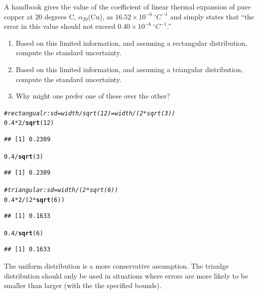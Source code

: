 \documentclass[twoside]{book}\usepackage[]{graphicx}\usepackage[]{xcolor}
\makeatletter
\newcommand{\hlnum}[1]{\textcolor[rgb]{0.686,0.059,0.569}{#1}}%
\newcommand{\hlcom}[1]{\textcolor[rgb]{0.678,0.584,0.686}{\textit{#1}}}%
\newcommand{\hlopt}[1]{\textcolor[rgb]{0,0,0}{#1}}%
\newcommand{\hlstd}[1]{\textcolor[rgb]{0.345,0.345,0.345}{#1}}%
\newcommand{\hlkwd}[1]{\textcolor[rgb]{0.737,0.353,0.396}{\textbf{#1}}}%
\newenvironment{kframe}{%
 \def\at@end@of@kframe{}%
 \ifinner\ifhmode%
  \def\at@end@of@kframe{\end{minipage}}%
  \begin{minipage}{\columnwidth}%
 \fi\fi%
 \def\FrameCommand##1{\hskip\@totalleftmargin \hskip-\fboxsep
 \colorbox{shadecolor}{##1}\hskip-\fboxsep
     \hskip-\linewidth \hskip-\@totalleftmargin \hskip\columnwidth}%
 \MakeFramed {\advance\hsize-\width
   \@totalleftmargin\z@ \linewidth\hsize
   \@setminipage}}%
 {\par\unskip\endMakeFramed%
 \at@end@of@kframe}
\newenvironment{knitrout}{}{} %
\makeatother
\begin{document}
\begin{problem}
A handbook gives the value of the coefficient of linear thermal expansion of 
pure copper at 20 degrees C, $\alpha_{20}$(Cu), as 
$16.52 \times 10^{-6} \ {}^\circ C^{-1}$
and simply states that ``the error in this value should not exceed 
$0.40 \times 10^{-6} \ {}^{\circ} C^{-1}$.''
\begin{enumerate}
\item
Based on this limited information, and assuming a rectangular distribution,
compute the standard uncertainty.
\item
Based on this limited information, and assuming a triangular distribution,
compute the standard uncertainty.
\item
Why might one prefer one of these over the other?
\end{enumerate}
\end{problem}

\begin{solution}
\begin{knitrout}
\color{fgcolor}\begin{kframe}
\begin{alltt}
\hlcom{# rectangualr: sd = width / sqrt(12) = width / (2 * sqrt(3))}
\hlnum{0.4} \hlopt{*} \hlnum{2} \hlopt{/} \hlkwd{sqrt}\hlstd{(}\hlnum{12}\hlstd{)}
\end{alltt}
\begin{verbatim}
## [1] 0.2309
\end{verbatim}
\begin{alltt}
\hlnum{0.4} \hlopt{/} \hlkwd{sqrt}\hlstd{(}\hlnum{3}\hlstd{)}
\end{alltt}
\begin{verbatim}
## [1] 0.2309
\end{verbatim}
\begin{alltt}
\hlcom{# triangular: sd = width / (2 * sqrt(6))}
\hlnum{0.4} \hlopt{*} \hlnum{2} \hlopt{/} \hlstd{(}\hlnum{2} \hlopt{*} \hlkwd{sqrt}\hlstd{(}\hlnum{6}\hlstd{))}
\end{alltt}
\begin{verbatim}
## [1] 0.1633
\end{verbatim}
\begin{alltt}
\hlnum{0.4} \hlopt{/} \hlkwd{sqrt}\hlstd{(}\hlnum{6}\hlstd{)}
\end{alltt}
\begin{verbatim}
## [1] 0.1633
\end{verbatim}
\end{kframe}
\end{knitrout}

The uniform distribution is a more conservative assumption.  The trianlge distribution should only
be used in situations where errors are more likely to be smaller than larger 
(with the the specified bounds).
\end{solution}
\end{document}
